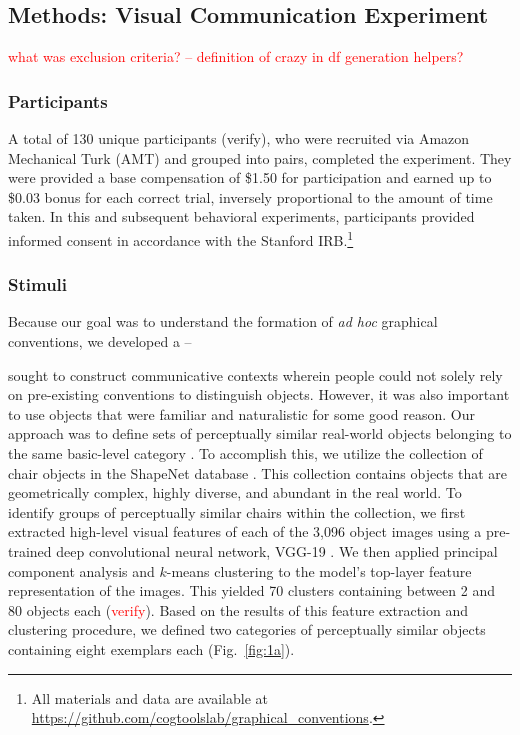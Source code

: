\documentclass[10pt,letterpaper]{article}
\newcommand{\red}[1]{\textcolor{Red}{#1}}
\begin{document}
\subsection{Methods: Visual Communication Experiment}

\red{what was exclusion criteria? -- definition of crazy in df generation helpers?}
\subsubsection{Participants} A total of 130 unique participants (verify), who were recruited via Amazon Mechanical Turk (AMT) and grouped into pairs, completed the experiment.
They were provided a base compensation of \$1.50 for participation and earned up to \$0.03 bonus for each correct trial, inversely proportional to the amount of time taken. 
In this and subsequent behavioral experiments, participants provided informed consent in accordance with the Stanford IRB.\footnote{All materials and data are available at \url{https://github.com/cogtoolslab/graphical_conventions}.}

\subsubsection{Stimuli} 


Because our goal was to understand the formation of \textit{ad hoc} graphical conventions, we developed a -- 

sought to construct communicative contexts wherein people could not solely rely on pre-existing conventions to distinguish objects.
However, it was also important to use objects that were familiar and naturalistic for some good reason.
Our approach was to define sets of perceptually similar real-world objects belonging to the same basic-level category \cite{MervisRosch81_CategorizationReview}.
To accomplish this, we utilize the collection of chair objects in the ShapeNet database \cite{chang2015shapenet}.
This collection contains objects that are geometrically complex, highly diverse, and abundant in the real world.
To identify groups of perceptually similar chairs within the collection, we first extracted high-level visual features of each of the 3,096 object images using a pre-trained deep convolutional neural network, VGG-19 \cite{simonyan2014very}. 
We then applied principal component analysis and $k$-means clustering to the model's top-layer feature representation of the images. 
This yielded 70 clusters containing between 2 and 80 objects each (\red{verify}).
Based on the results of this feature extraction and clustering procedure, we defined two categories of perceptually similar objects containing eight exemplars each (Fig.~\ref{fig:1a}). 
\end{document}
